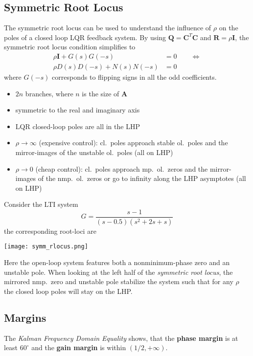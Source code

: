 \subsection{Symmetric Root Locus}
The symmetric root locus can be used to understand the influence of $\rho$ on the poles of a closed loop LQR feedback system.
By using $\mathbf{Q}=\mathbf{C}^T \mathbf{C}$ and $\mathbf{R}=\rho \mathbf{I}$, the symmetric root locus condition simplifies to
\noindent\begin{align*}
    \rho \mathbf{I}+G(s)G(-s) & =0 \qquad \Leftrightarrow \\
    \rho D(s)D(-s)+N(s)N(-s)  & =0
\end{align*}
where $G(-s)$ corresponds to flipping signs in all the odd coefficients.

\begin{itemize}
    \item $2n$ branches, where $n$ is the size of $\mathbf{A}$
    \item symmetric to the real and imaginary axis
    \item LQR closed-loop poles are all in the LHP
    \item $\rho \rightarrow \infty$ (expensive control):\newline
          cl.\ poles approach stable ol.\ poles and the mirror-images of the unstable ol.\ poles (all on LHP)
    \item $\rho \rightarrow 0$ (cheap control):\newline
          cl.\ poles approach mp.\ ol.\ zeros and the mirror-images of the nmp.\ ol.\ zeros or go to infinity along the LHP asymptotes (all on LHP)
\end{itemize}

\begin{examplesection}
    Consider the LTI system
    \noindent\begin{equation*}
        G = \frac{s-1}{(s-0.5)(s^2+2s+s)}
    \end{equation*}
    the corresponding root-loci are
    \begin{center}
        \texttt{[image: symm\_rlocus.png]}
    \end{center}
    Here the open-loop system features both a nonminimum-phase zero and an unstable pole.
    When looking at the left half of the \textit{symmetric root locus}, the mirrored nmp.\ zero and unstable pole stabilize the system such that
    for any $\rho$ the closed loop poles will stay on the LHP.
\end{examplesection}

\subsection{Margins}
The \textit{Kalman Frequency Domain Equality} shows, that the \textbf{phase margin} is at least $60^\circ$ and the \textbf{gain margin} is within $(1/2, +\infty)$.